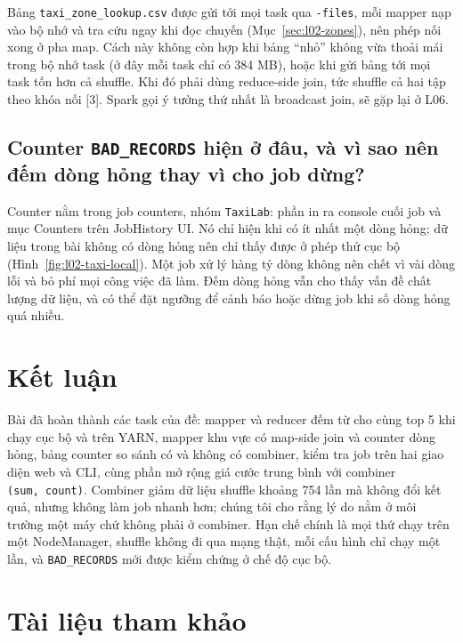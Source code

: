 \documentclass[
  12pt,
  a4paper,
]{report}
\begin{document}
Bảng
\texttt{taxi\_}\allowbreak{}\texttt{zone\_}\allowbreak{}\texttt{lookup.}\allowbreak{}\texttt{csv}\allowbreak{}
được gửi tới mọi task qua \texttt{-files}, mỗi mapper nạp vào bộ nhớ và
tra cứu ngay khi đọc chuyến (Mục~\ref{sec:l02-zones}), nên phép nối xong
ở pha map. Cách này không còn hợp khi bảng ``nhỏ'' không vừa thoải mái
trong bộ nhớ task (ở đây mỗi task chỉ có 384 MB), hoặc khi gửi bảng tới
mọi task tốn hơn cả shuffle. Khi đó phải dùng reduce-side join, tức
shuffle cả hai tập theo khóa nối {[}3{]}. Spark gọi ý tưởng thứ nhất là
broadcast join, sẽ gặp lại ở L06.

\subsection{\texorpdfstring{Counter \texttt{BAD\_RECORDS} hiện ở đâu, và
vì sao nên đếm dòng hỏng thay vì cho job
dừng?}{Counter BAD\_RECORDS hiện ở đâu, và vì sao nên đếm dòng hỏng thay vì cho job dừng?}}\label{sec:l02-q8}

Counter nằm trong job counters, nhóm \texttt{TaxiLab}: phần in ra
console cuối job và mục Counters trên JobHistory UI. Nó chỉ hiện khi có
ít nhất một dòng hỏng; dữ liệu trong bài không có dòng hỏng nên chỉ thấy
được ở phép thử cục bộ (Hình~\ref{fig:l02-taxi-local}). Một job xử lý
hàng tỷ dòng không nên chết vì vài dòng lỗi và bỏ phí mọi công việc đã
làm. Đếm dòng hỏng vẫn cho thấy vấn đề chất lượng dữ liệu, và có thể đặt
ngưỡng để cảnh báo hoặc dừng job khi số dòng hỏng quá nhiều.

\section{Kết luận}\label{sec:l02-conclusion}

Bài đã hoàn thành các task của đề: mapper và reducer đếm từ cho cùng top
5 khi chạy cục bộ và trên YARN, mapper khu vực có map-side join và
counter dòng hỏng, bảng counter so sánh có và không có combiner, kiểm
tra job trên hai giao diện web và CLI, cùng phần mở rộng giá cước trung
bình với combiner \texttt{(sum,\ count)}. Combiner giảm dữ liệu shuffle
khoảng 754 lần mà không đổi kết quả, nhưng không làm job nhanh hơn;
chúng tôi cho rằng lý do nằm ở môi trường một máy chứ không phải ở
combiner. Hạn chế chính là mọi thứ chạy trên một NodeManager, shuffle
không đi qua mạng thật, mỗi cấu hình chỉ chạy một lần, và
\texttt{BAD\_RECORDS} mới được kiểm chứng ở chế độ cục bộ.

\section*{Tài liệu tham khảo}\label{tuxe0i-liux1ec7u-tham-khux1ea3o-1}
\end{document}
